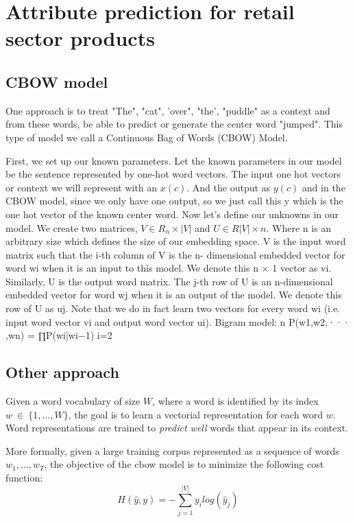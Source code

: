 \chapter{Attribute prediction for retail sector products} %
\label{cha:attribute_prediction_for_retail_sector_products}

\section{CBOW model} %

One approach is to treat {"The", "cat", ’over", "the’, "puddle"} as a context and from these words, be able to predict or generate the center word "jumped". This type of model we call a Continuous Bag of Words (CBOW) Model.



First, we set up our known parameters. Let the known parameters in our model be the sentence represented by one-hot word vectors. The input one hot vectors or context we will represent with an $x(c)$. And the output as $y(c)$ and in the CBOW model, since we only have one output, so we just call this y which is the one hot vector of the known center word. Now let’s define our unknowns in our model.
We create two matrices, $V \in R_n×|V|$ and $U \in R|V|×n$. Where n
is an arbitrary size which defines the size of our embedding space.
V is the input word matrix such that the i-th column of V is the n- dimensional embedded vector for word wi when it is an input to this model. We denote this n × 1 vector as vi. Similarly, U is the output word matrix. The j-th row of U is an n-dimensional embedded vector for word wj when it is an output of the model. We denote this row of U as uj. Note that we do in fact learn two vectors for every word wi (i.e. input word vector vi and output word vector ui).
Bigram model:
n P(w1,w2,··· ,wn) = ∏P(wi|wi−1)
i=2




\section{Other approach}


Given a word vocabulary of size $W$, where a word is identified by its index $w~\in~\{1, ..., W\}$, the goal is to learn a vectorial representation for each word $w$.
Word representations are trained to \emph{predict well} words that appear in its context.

More formally, given a large training corpus represented as a sequence of words $w_1, ..., w_T$, the objective of the cbow model is to minimize the following cost function:
\begin{equation*}
  H(\hat y, y) = - \sum_{j=1}^{|V|} y_i log(\hat y_j)
\end{equation*}



